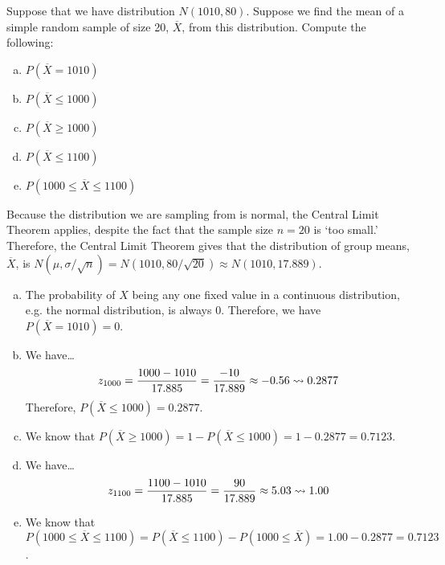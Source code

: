 \documentclass[11pt,letterpaper]{article}
\begin{document}

 Suppose that we have distribution $N(1010, 80)$. Suppose we find the mean of a simple random sample of size 20, $\overline{X}$, from this distribution. Compute the following:
	\begin{enumerate}[(a)]
	\item $P(\overline{X}= 1010)$
	\item $P(\overline{X} \leq 1000)$
	\item $P(\overline{X} \geq 1000)$
	\item $P(\overline{X} \leq 1100)$
	\item $P(1000 \leq \overline{X} \leq 1100)$
	\end{enumerate} \pspace

\sol Because the distribution we are sampling from is normal, the Central Limit Theorem applies, despite the fact that the sample size $n= 20$ is `too small.' Therefore, the Central Limit Theorem gives that the distribution of group means, $\overline{X}$, is $N(\mu, \sigma/\sqrt{n})= N(1010, 80/\sqrt{20}) \approx N(1010, 17.889)$. \pspace

\begin{enumerate}[(a)]
\item The probability of $X$ being any one fixed value in a continuous distribution, e.g. the normal distribution, is always 0. Therefore, we have $P(\overline{X}= 1010)= 0$. \pspace 

\item We have\dots
	\[
	z_{1000}= \dfrac{1000 - 1010}{17.885}= \dfrac{-10}{17.889} \approx -0.56 \rightsquigarrow 0.2877
	\]
Therefore, $P(\overline{X} \leq 1000)= 0.2877$. 

\item We know that $P(\overline{X} \geq 1000)= 1 - P(\overline{X} \leq 1000)= 1 - 0.2877= 0.7123$. \pspace
 
\item We have\dots
	\[
	z_{1100}= \dfrac{1100 - 1010}{17.885}= \dfrac{90}{17.889} \approx 5.03 \rightsquigarrow 1.00
	\] 

\item We know that $P(1000 \leq \overline{X} \leq 1100)= P(\overline{X} \leq 1100) - P(1000 \leq \overline{X})= 1.00 - 0.2877= 0.7123$. 
\end{enumerate}



\newpage
\end{document}
